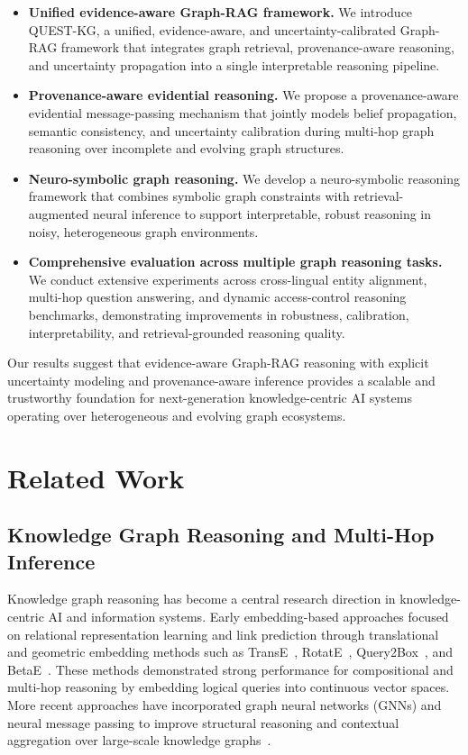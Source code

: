 \documentclass[sigconf,review,anonymous]{acmart}
\begin{document}
\begin{itemize}
    \item \textbf{Unified evidence-aware Graph-RAG framework.}
    We introduce QUEST-KG, a unified, evidence-aware, and uncertainty-calibrated Graph-RAG framework that integrates graph retrieval, provenance-aware reasoning, and uncertainty propagation into a single interpretable reasoning pipeline.

    \item \textbf{Provenance-aware evidential reasoning.}
    We propose a provenance-aware evidential message-passing mechanism that jointly models belief propagation, semantic consistency, and uncertainty calibration during multi-hop graph reasoning over incomplete and evolving graph structures.

    \item \textbf{Neuro-symbolic graph reasoning.}
    We develop a neuro-symbolic reasoning framework that combines symbolic graph constraints with retrieval-augmented neural inference to support interpretable, robust reasoning in noisy, heterogeneous graph environments.

    \item \textbf{Comprehensive evaluation across multiple graph reasoning tasks.}
    We conduct extensive experiments across cross-lingual entity alignment, multi-hop question answering, and dynamic access-control reasoning benchmarks, demonstrating improvements in robustness, calibration, interpretability, and retrieval-grounded reasoning quality.
\end{itemize}

Our results suggest that evidence-aware Graph-RAG reasoning with explicit uncertainty modeling and provenance-aware inference provides a scalable and trustworthy foundation for next-generation knowledge-centric AI systems operating over heterogeneous and evolving graph ecosystems.

\section{Related Work}

\subsection{Knowledge Graph Reasoning and Multi-Hop Inference}

Knowledge graph reasoning has become a central research direction in knowledge-centric AI and information systems. Early embedding-based approaches focused on relational representation learning and link prediction through translational and geometric embedding methods such as TransE~\cite{bordes2013transe}, RotatE~\cite{sun2019rotate}, Query2Box~\cite{ren2020query2box}, and BetaE~\cite{ren2020betae}. These methods demonstrated strong performance for compositional and multi-hop reasoning by embedding logical queries into continuous vector spaces. More recent approaches have incorporated graph neural networks (GNNs) and neural message passing to improve structural reasoning and contextual aggregation over large-scale knowledge graphs~\cite{schlichtkrull2018modeling,velivckovic2018graph}. 
\end{document}
